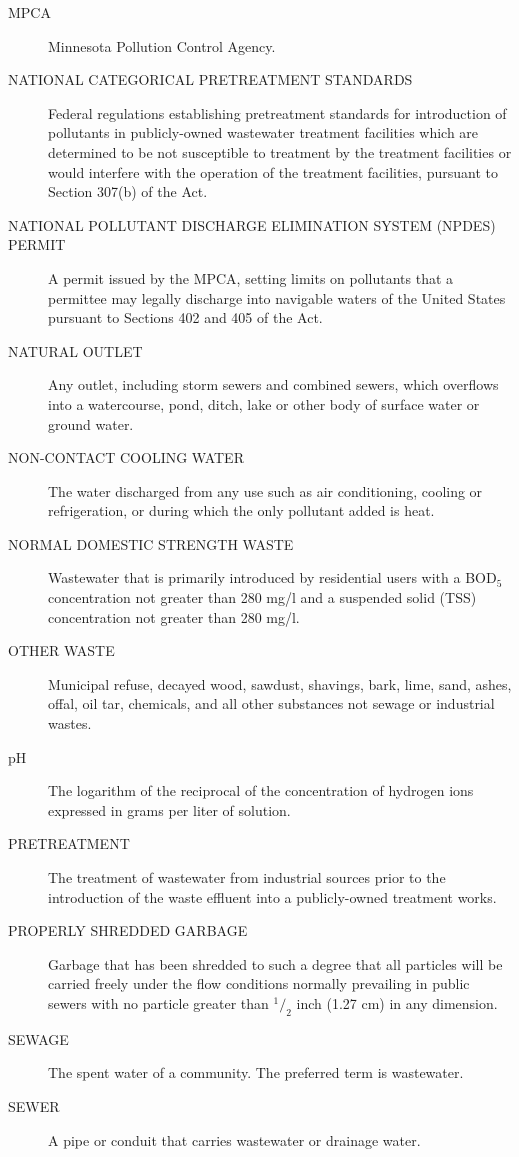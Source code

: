 \begin{description}
\item[MPCA] Minnesota Pollution Control Agency.
\item[NATIONAL CATEGORICAL PRETREATMENT STANDARDS] Federal regulations establishing pretreatment standards for introduction of pollutants in publicly-owned wastewater treatment facilities which are determined to be not susceptible to treatment by the treatment facilities or would interfere with the operation of the treatment facilities, pursuant to Section 307(b) of the Act.
\item[NATIONAL POLLUTANT DISCHARGE ELIMINATION SYSTEM (NPDES) PERMIT] A permit issued by the MPCA, setting limits on pollutants that a permittee may legally discharge into navigable waters of the United States pursuant to Sections 402 and 405 of the Act.
\item[NATURAL OUTLET] Any outlet, including storm sewers and combined sewers, which overflows into a watercourse, pond, ditch, lake or other body of surface water or ground water.
\item[NON-CONTACT COOLING WATER] The water discharged from any use such as air conditioning, cooling or refrigeration, or during which the only pollutant added is heat.
\item[NORMAL DOMESTIC STRENGTH WASTE] Wastewater that is primarily introduced by residential users with a BOD$_{5}$ concentration not greater than 280 mg/l and a suspended solid (TSS) concentration not greater than 280 mg/l.
\item[OTHER WASTE] Municipal refuse, decayed wood, sawdust, shavings, bark, lime, sand, ashes, offal, oil tar, chemicals, and all other substances not sewage or industrial wastes.
\item[pH] The logarithm of the reciprocal of the concentration of hydrogen ions expressed in grams per liter of solution.
\item[PRETREATMENT] The treatment of wastewater from industrial sources prior to the introduction of the waste effluent into a publicly-owned treatment works.
\item[PROPERLY SHREDDED GARBAGE] Garbage that has been shredded to such a degree that all particles will be carried freely under the flow conditions normally prevailing in public sewers with no particle greater than ${^1/_2}$ inch (1.27 cm) in any dimension.
\item[SEWAGE] The spent water of a community.  The preferred term is wastewater.
\item[SEWER] A pipe or conduit that carries wastewater or drainage water.

\end{description}
